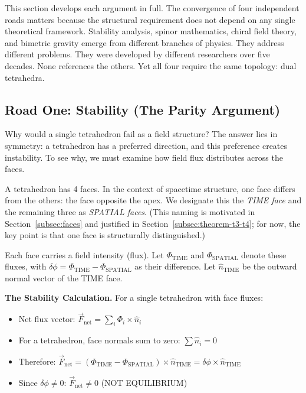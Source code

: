 \documentclass[aps,prd,preprint,superscriptaddress,showpacs,preprintnumbers,amsmath,amssymb,nofootinbib]{revtex4-2}
\begin{document}
This section develops each argument in full. The convergence of four independent roads matters because the structural requirement does not depend on any single theoretical framework. Stability analysis, spinor mathematics, chiral field theory, and bimetric gravity emerge from different branches of physics. They address different problems. They were developed by different researchers over five decades. None references the others. Yet all four require the same topology: dual tetrahedra.

\subsection{Road One: Stability (The Parity Argument)}
\label{subsec:road-stability}

Why would a single tetrahedron fail as a field structure? The answer lies in symmetry: a tetrahedron has a preferred direction, and this preference creates instability. To see why, we must examine how field flux distributes across the faces.

A tetrahedron has 4 faces. In the context of spacetime structure, one face differs from the others: the face opposite the apex. We designate this the \emph{TIME face} and the remaining three as \emph{SPATIAL faces}. (This naming is motivated in Section~\ref{subsec:faces} and justified in Section~\ref{subsec:theorem-t3-t4}; for now, the key point is that one face is structurally distinguished.)

Each face carries a field intensity (flux). Let $\Phi_{\text{TIME}}$ and $\Phi_{\text{SPATIAL}}$ denote these fluxes, with $\delta\phi = \Phi_{\text{TIME}} - \Phi_{\text{SPATIAL}}$ as their difference. Let $\hat{n}_{\text{TIME}}$ be the outward normal vector of the TIME face.

\textbf{The Stability Calculation.} For a single tetrahedron with face fluxes:
\begin{itemize}
\item Net flux vector: $\vec{F}_{\text{net}} = \sum_i \Phi_i \times \hat{n}_i$
\item For a tetrahedron, face normals sum to zero: $\sum \hat{n}_i = 0$
\item Therefore: $\vec{F}_{\text{net}} = (\Phi_{\text{TIME}} - \Phi_{\text{SPATIAL}}) \times \hat{n}_{\text{TIME}} = \delta\phi \times \hat{n}_{\text{TIME}}$
\item Since $\delta\phi \neq 0$: $\vec{F}_{\text{net}} \neq 0$ (NOT EQUILIBRIUM)
\end{itemize}
\end{document}
